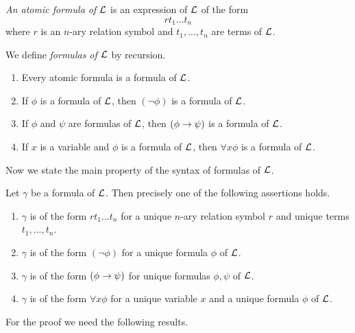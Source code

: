 \begin{definition}
\textit{An atomic formula of ${\mathcal L}$} is an expression of ${\mathcal L}$ of the form
$$rt_1...t_n$$
where $r$ is an $n$-ary relation symbol and $t_1, ...,t_n$ are terms of ${\mathcal L}$.
\end{definition}

\begin{definition}
We define \textit{formulas of ${\mathcal L}$} by recursion.
\begin{enumerate}[label=\textbf{(\arabic*)}, leftmargin=3.0em]
\item Every atomic formula is a formula of ${\mathcal L}$.
\item If $\phi$ is a formula of ${\mathcal L}$, then $(\neg \phi)$ is a formula of ${\mathcal L}$.
\item If $\phi$ and $\psi$ are formulas of ${\mathcal L}$, then $(\phi\rightarrow \psi)$ is a formula of ${\mathcal L}$.
\item If $x$ is a variable and $\phi$ is a formula of ${\mathcal L}$, then $\forall x\phi$ is a formula of ${\mathcal L}$.
\end{enumerate}
\end{definition}
\noindent
Now we state the main property of the syntax of formulas of ${\mathcal L}$.

\begin{theorem}\label{theorem:unique_readability_of_formulas}
Let $\gamma$ be a formula of ${\mathcal L}$. Then precisely one of the following assertions holds.
\begin{enumerate}[label=\textbf{\emph{(\arabic*)}}, leftmargin=3.0em]
\item $\gamma$ is of the form $rt_1...t_n$ for a unique $n$-ary relation symbol $r$ and unique terms $t_1 , ..., t_n$.
\item $\gamma$ is of the form $(\neg \phi)$ for a unique formula $\phi$ of ${\mathcal L}$.
\item $\gamma$ is of the form $(\phi \rightarrow \psi)$ for unique formulas $\phi, \psi$ of ${\mathcal L}$.
\item $\gamma$ is of the form $\forall x \phi$ for a unique variable $x$ and a unique formula $\phi$ of ${\mathcal L}$.
\end{enumerate}
\end{theorem}
\noindent
For the proof we need the following results.

